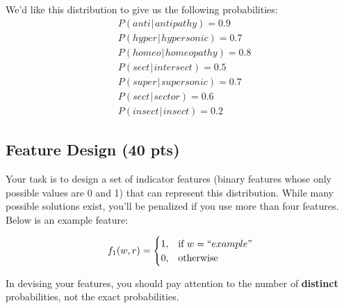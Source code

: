 \documentclass[11pt,twoside]{article}
\begin{document}
We'd like this distribution to give us the following probabilities:
\begin{align*}
& P \left( anti \hspace{1pt}\vert\hspace{1pt} antipathy \right) = 0.9 \\
& P \left( hyper \hspace{1pt}\vert\hspace{1pt} hypersonic \right) = 0.7 \\
& P \left( homeo \hspace{1pt}\vert\hspace{1pt} homeopathy \right) = 0.8 \\
& P \left( sect \hspace{1pt}\vert\hspace{1pt} intersect \right) = 0.5 \\
& P \left( super \hspace{1pt}\vert\hspace{1pt} supersonic \right) = 0.7 \\
& P \left( sect \hspace{1pt}\vert\hspace{1pt} sector \right) = 0.6 \\ 
& P \left( insect \hspace{1pt}\vert\hspace{1pt} insect \right) = 0.2
\end{align*}

\subsection{Feature Design (40 pts)}
Your task is to design a set of indicator features (binary features whose only possible values are 0 and 1) that can represent this distribution. While many possible solutions exist, you'll be penalized if you use more than four features. Below is an example feature:

\begin{align*}
& f_1(w, r) = 
	\begin{cases}
		1, & \text{if } w = ``example"\\
		0, & \text{otherwise}
	\end{cases} \\
\end{align*}

In devising your features, you should pay attention to the number of {\bf distinct} probabilities, not the exact probabilities.
\end{document}
